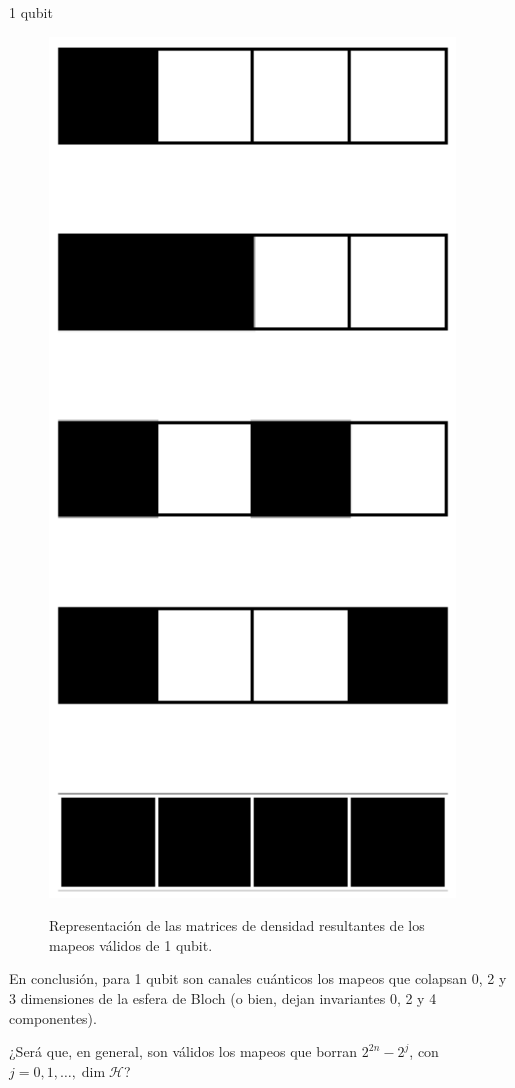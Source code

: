 \documentclass[11pt]{beamer}
\begin{document}
\begin{frame}{1 qubit}
\begin{figure}[H]
\centering
\caption{Representación de las matrices de densidad resultantes de
los mapeos válidos de 1 qubit.}
\includegraphics[height=0.35\textheight]{img-congreso/1qubit-CCs.pdf}
\label{fig:1qubit-CCs}
\end{figure}

En conclusión, para 1 qubit son canales cuánticos los mapeos que colapsan 0,
2 y 3 dimensiones de la esfera de Bloch (o bien, dejan invariantes 0, 2 y 4
componentes). \vfill

¿Será que, en general, son válidos los mapeos que borran $2^{2n} - 2^j$, con
$j = 0, 1, \ldots, \dim \mathcal{H}$?\vfill
\end{frame}
\end{document}
